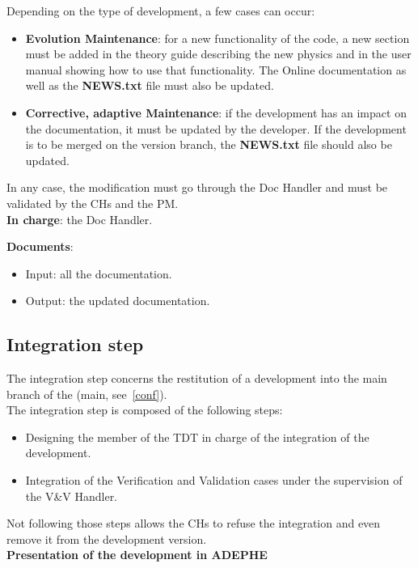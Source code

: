 Depending on the type of development, a few cases can occur:
\begin{itemize}
\item \textbf{Evolution Maintenance}: for a new functionality of the code, a
  new section must be added in the theory guide describing the new physics and
  in the user manual showing how to use that functionality. The Online
  documentation as well as the \textbf{NEWS.txt} file must also be updated.
\item \textbf{Corrective, adaptive Maintenance}: if the development has an
  impact on the documentation, it must be updated by the developer. If the
  development is to be merged on the version branch, the \textbf{NEWS.txt} file
  should also be updated.
\end{itemize}

In any case, the modification must go through the Doc Handler and must be
validated by the CHs and the PM\@.\\

\textbf{In charge}: the Doc Handler.

\textbf{Documents}:
\begin{itemize}
\item Input: all the documentation.
\item Output: the updated documentation.
\end{itemize}

\subsection{Integration step}

The integration step concerns the restitution of a development into the
main branch of the \telemacsystem{} (main, see~\ref{conf}).\\

The integration step is composed of the following steps:
\begin{itemize}
\item Designing the member of the TDT in charge of the integration of the
  development.
\item Integration of the Verification and Validation cases under the
  supervision of the V\&V Handler.
\end{itemize}

Not following those steps allows the CHs to refuse the integration and even
remove it from the development version.\\

\textbf{Presentation of the development in ADEPHE}

